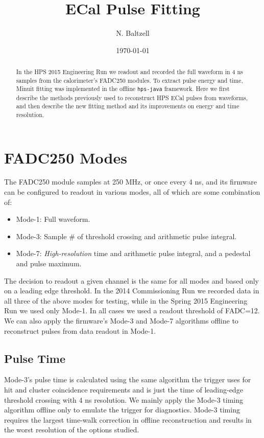 \documentclass[amsmath,amssymb,notitlepage,12pt]{revtex4-1}
\begin{document}

\title{ECal Pulse Fitting}
\author{N. Baltzell}
\date{\today}
\begin{abstract}
In the HPS 2015 Engineering Run we readout and recorded the full waveform in 4 ns samples from the calorimeter's FADC250 modules. 
To extract pulse energy and time, Minuit fitting was implemented in the offline \texttt{hps-java} framework.
Here we first describe the methods previously used to reconstruct HPS ECal pulses from waveforms, and then describe the new fitting method and its improvements on energy and time resolution.
\end{abstract}
\maketitle

\section{FADC250 Modes}
The FADC250 module samples at 250 MHz, or once every 4 ns, and its firmware can be configured to readout in various modes, all of which are some combination of:
\begin{itemize}
  \item Mode-1:  Full waveform.
  \item Mode-3:  Sample \# of threshold crossing and arithmetic pulse integral.  
  \item Mode-7:  {\em High-resolution} time and arithmetic pulse integral, and a pedestal and pulse maximum.
\end{itemize}
The decision to readout a given channel is the same for all modes and based only on a leading edge threshold.
In the 2014 Commissioning Run we recorded data in all three of the above modes for testing, while in the Spring 2015 Engineering Run we used only Mode-1.  In all cases we used a readout threshold of FADC=12.
We can also apply the firmware's Mode-3 and Mode-7 algorithms offline to reconstruct pulses from data readout in Mode-1.

\subsection{Pulse Time}
Mode-3's pulse time is calculated using the same algorithm the trigger uses for hit and cluster coincidence requirements and is just the time of leading-edge threshold crossing with 4 ns resolution.  We mainly apply the Mode-3 timing algorithm offline only to emulate the trigger for diagnostics.  Mode-3 timing requires the largest time-walk correction in offline reconstruction and results in the worst resolution of the options studied.
\end{document}
